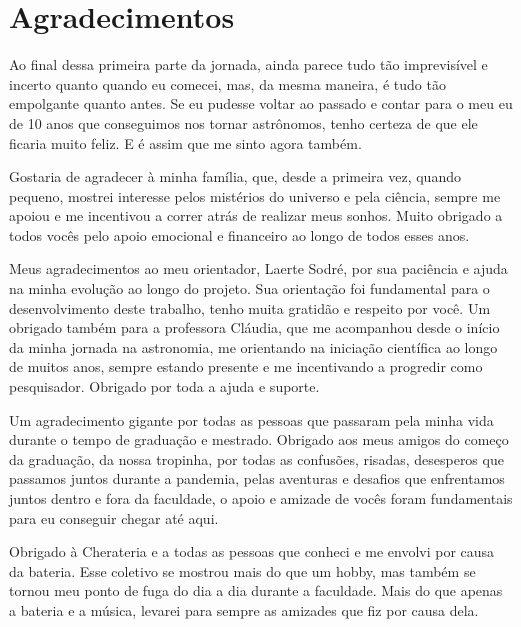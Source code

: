 \thispagestyle{empty}%

\chapter*{Agradecimentos}
Ao final dessa primeira parte da jornada, ainda parece tudo tão imprevisível e incerto quanto quando eu comecei, mas, da mesma maneira, é tudo tão empolgante quanto antes. Se eu pudesse voltar ao passado e contar para o meu eu de 10 anos que conseguimos nos tornar astrônomos, tenho certeza de que ele ficaria muito feliz. E é assim que me sinto agora também.

Gostaria de agradecer à minha família, que, desde a primeira vez, quando pequeno, mostrei interesse pelos mistérios do universo e pela ciência, sempre me apoiou e me incentivou a correr atrás de realizar meus sonhos. Muito obrigado a todos vocês pelo apoio emocional e financeiro ao longo de todos esses anos.

Meus agradecimentos ao meu orientador, Laerte Sodré, por sua paciência e ajuda na minha evolução ao longo do projeto. Sua orientação foi fundamental para o desenvolvimento deste trabalho, tenho muita gratidão e respeito por você. Um obrigado também para a professora Cláudia, que me acompanhou desde o início da minha jornada na astronomia, me orientando na iniciação científica ao longo de muitos anos, sempre estando presente e me incentivando a progredir como pesquisador. Obrigado por toda a ajuda e suporte.

Um agradecimento gigante por todas as pessoas que passaram pela minha vida durante o tempo de graduação e mestrado. Obrigado aos meus amigos do começo da graduação, da nossa tropinha, por todas as confusões, risadas, desesperos que passamos juntos durante a pandemia, pelas aventuras e desafios que enfrentamos juntos dentro e fora da faculdade, o apoio e amizade de vocês foram fundamentais para eu conseguir chegar até aqui.

Obrigado à Cherateria e a todas as pessoas que conheci e me envolvi por causa da bateria. Esse coletivo se mostrou mais do que um hobby, mas também se tornou meu ponto de fuga do dia a dia durante a faculdade. Mais do que apenas a bateria e a música, levarei para sempre as amizades que fiz por causa dela.

